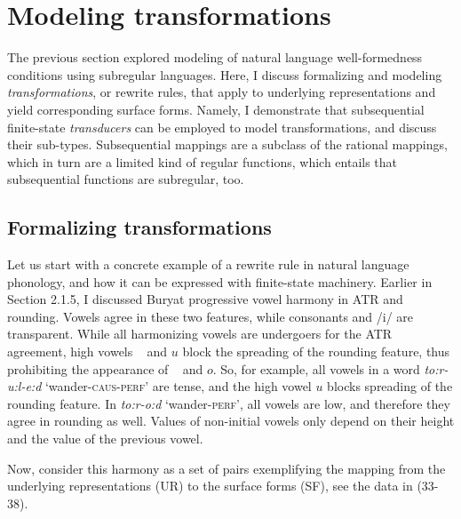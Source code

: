 \section{Modeling transformations}
\label{modelingtransofrmationsection}

The previous section explored modeling of natural language well-formedness conditions using subregular languages.
Here, I discuss formalizing and modeling \emph{transformations}, or rewrite rules, that apply to underlying representations and yield corresponding surface forms.
Namely, I demonstrate that subsequential finite-state \emph{transducers} can be employed to model transformations, and discuss their sub-types.
Subsequential mappings are a subclass of the rational mappings, which in turn are a limited kind of regular functions, which entails that subsequential functions are subregular, too.


\subsection{Formalizing transformations}
\label{FSTforburyat}


Let us start with a concrete example of a rewrite rule in natural language phonology, and how it can be expressed with finite-state machinery.
Earlier in Section 2.1.5, I discussed Buryat progressive vowel harmony in ATR and rounding.
Vowels agree in these two features, while consonants and /i/ are transparent.
While all harmonizing vowels are undergoers for the ATR agreement, high vowels \textupsilon~ and $u$ block the spreading of the rounding feature, thus prohibiting the appearance of \textopeno~ and $o$.
So, for example, all vowels in a word \emph{to:r-u:l-e:d} `wander-\textsc{caus-perf}' are tense, and the high vowel $u$ blocks spreading of the rounding feature.
In \emph{to:r-o:d} `wander-\textsc{perf}', all vowels are low, and therefore they agree in rounding as well.
Values of non-initial vowels only depend on their height and the value of the previous vowel.

Now, consider this harmony as a set of pairs exemplifying the mapping from the underlying representations (UR) to the surface forms (SF), see the data in (33-38).

